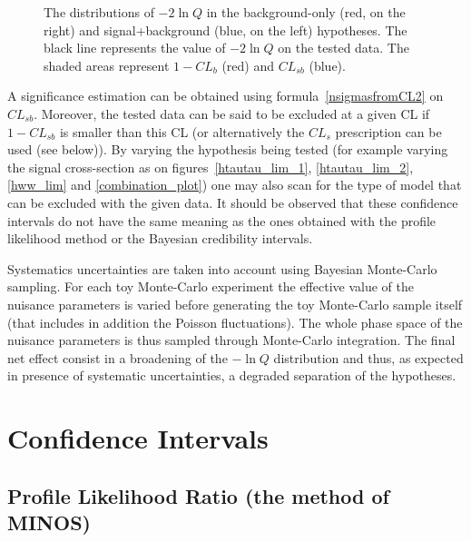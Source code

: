 \documentclass[11pt]{article}
\begin{document}
\begin{figure}[h]
    \begin{center}
        \caption{The distributions of $-2\ln Q$ in the background-only
                 (red, on the right) and signal+background (blue,
                 on the left) hypotheses. The black line represents
                 the value of $-2\ln Q$ on the tested data.  The
                 shaded areas represent $1-CL_{b}$ (red) and $CL_{sb}$
                 (blue).\label{m2lnQ}}
    \end{center}
\end{figure}

A significance estimation can be obtained using formula~\ref{nsigmasfromCL2} on
$CL_{sb}$. Moreover, the tested data can be said to be excluded at a
given CL if $1-CL_{sb}$ is smaller than this CL (or alternatively the
$CL_s$ prescription can be used (see below)). By varying the
hypothesis being tested (for example varying the signal cross-section
as on figures~\ref{htautau_lim_1}, \ref{htautau_lim_2}, \ref{hww_lim}
and \ref{combination_plot}) one may also scan for the type of model
that can be excluded with the given data.
It should be observed that these confidence intervals do not have the
same meaning as the ones obtained with the profile likelihood method
or the Bayesian credibility intervals.
\par
Systematics uncertainties are taken into account  using Bayesian
Monte-Carlo sampling.
For each toy Monte-Carlo experiment the effective value 
of the nuisance parameters is varied before generating the toy Monte-Carlo sample itself 
(that includes in addition the Poisson fluctuations).
The whole phase space of the nuisance parameters is thus sampled through
Monte-Carlo integration. The final net effect consist in a broadening
of the $-\ln Q$ distribution and thus, as expected in presence of
systematic uncertainties, a degraded separation of the hypotheses.


\section{Confidence Intervals}

	\subsection{Profile Likelihood Ratio (the method of MINOS)}
\end{document}
